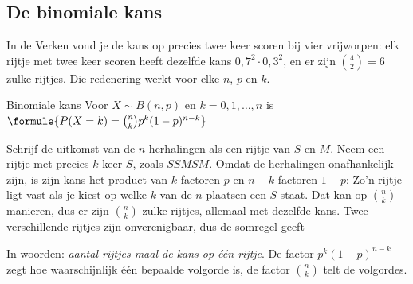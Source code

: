 \subsection{De binomiale kans}

In de Verken vond je de kans op precies twee keer scoren bij vier vrijworpen: elk rijtje met twee keer scoren heeft dezelfde kans $0{,}7^2 \cdot 0{,}3^2$, en er zijn $\binom42 = 6$ zulke rijtjes. Die redenering werkt voor elke $n$, $p$ en $k$.

\begin{theorie}
\begin{stelling}{Binomiale kans}
Voor $X \sim B(n, p)$ en $k = 0, 1, \ldots, n$ is \quad $\formule{P(X = k) = \binom{n}{k} p^k (1 - p)^{n - k}}$
\end{stelling}

\begin{bewijs}
Schrijf de uitkomst van de $n$ herhalingen als een rijtje van $S$ en $M$. Neem een rijtje met precies $k$ keer $S$, zoals $SS\!M\!S\!M$. Omdat de herhalingen onafhankelijk zijn, is zijn kans het product van $k$ factoren $p$ en $n - k$ factoren $1 - p$:
Zo'n rijtje ligt vast als je kiest op welke $k$ van de $n$ plaatsen een $S$ staat. Dat kan op $\binom{n}{k}$ manieren, dus er zijn $\binom{n}{k}$ zulke rijtjes, allemaal met dezelfde kans. Twee verschillende rijtjes zijn onverenigbaar, dus de somregel geeft
\end{bewijs}
\end{theorie}

In woorden: \textit{aantal rijtjes maal de kans op één rijtje}. De factor $p^k(1 - p)^{n - k}$ zegt hoe waarschijnlijk één bepaalde volgorde is, de factor $\binom{n}{k}$ telt de volgordes.


